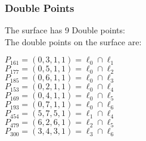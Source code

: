 \documentclass{article}
\begin{document}
{\subsubsection*{Double Points}
The surface has 9 Double points:\\
The double points on the surface are:\\
\begin{multicols}{2}
\noindent
$P_{161} = ( 0, 3, 1, 1 ) = \ell_{0} \cap \ell_{1} $\\
$P_{177} = ( 0, 5, 1, 1 ) = \ell_{0} \cap \ell_{2} $\\
$P_{185} = ( 0, 6, 1, 1 ) = \ell_{0} \cap \ell_{3} $\\
$P_{153} = ( 0, 2, 1, 1 ) = \ell_{0} \cap \ell_{4} $\\
$P_{169} = ( 0, 4, 1, 1 ) = \ell_{0} \cap \ell_{5} $\\
$P_{193} = ( 0, 7, 1, 1 ) = \ell_{0} \cap \ell_{6} $\\
$P_{454} = ( 5, 7, 5, 1 ) = \ell_{1} \cap \ell_{4} $\\
$P_{479} = ( 6, 2, 6, 1 ) = \ell_{2} \cap \ell_{5} $\\
$P_{300} = ( 3, 4, 3, 1 ) = \ell_{3} \cap \ell_{6} $\\
\end{multicols}
}
\end{document}
